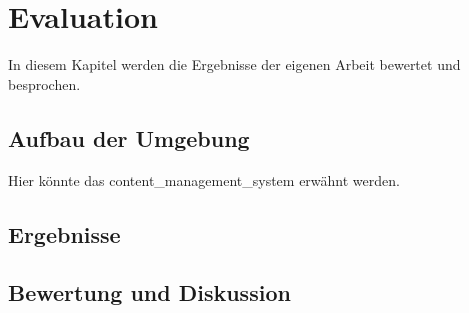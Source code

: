 \chapter{Evaluation}%
In diesem Kapitel werden die Ergebnisse der eigenen Arbeit bewertet und besprochen.
\section{Aufbau der Umgebung}
Hier könnte das \Gls{content_management_system} erwähnt werden.
\section{Ergebnisse}
\section{Bewertung und Diskussion}
